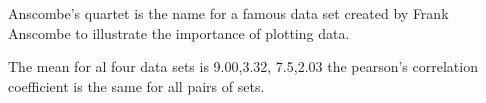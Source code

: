 
Anscombe's quartet is the name for a famous data set created by Frank Anscombe to illustrate the importance of plotting data.

The mean for al four data sets is 9.00,3.32, 7.5,2.03
the pearson's correlation coefficient is the same for all pairs of sets.


